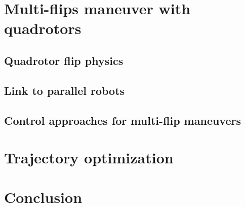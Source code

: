\documentclass{thesisreport}
\begin{document}
 \chapter{Multi-flips maneuver with quadrotors}
 
 \section{Quadrotor flip physics}
 
 \section{Link to parallel robots}
 
 \section{Control approaches for multi-flip maneuvers}
  
 \chapter{Trajectory optimization} 
 
 \chapter*{Conclusion}
 
 
 
 


 \nocite{*}
 
 


 
\end{document}
